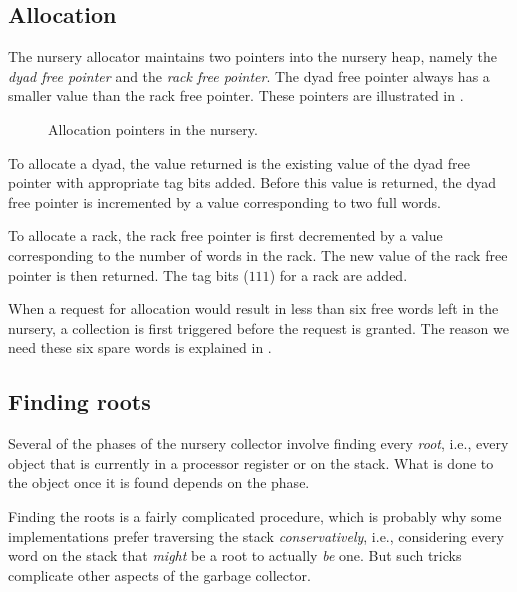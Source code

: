 \subsection{Allocation}

The nursery allocator maintains two pointers into the nursery heap,
namely the \emph{dyad free pointer} and the \emph{rack free
  pointer}.  The dyad free pointer always has a smaller value than
the rack free pointer.  These pointers are illustrated in
.

\begin{figure}
\begin{center}
\end{center}
\caption{\label{fig-nursery-pointers}
Allocation pointers in the nursery.}
\end{figure}

To allocate a dyad, the value returned is the existing value of the
dyad free pointer with appropriate tag bits added.  Before this value
is returned, the dyad free pointer is incremented by a value
corresponding to two full words.

To allocate a rack, the rack free pointer is first decremented by a
value corresponding to the number of words in the rack.  The new value
of the rack free pointer is then returned.  The tag bits ($111$) for a
rack are added.

When a request for allocation would result in less than six free words
left in the nursery, a collection is first triggered before the
request is granted.  The reason we need these six spare words is
explained in .

\subsection{Finding roots}
\label{sec-garbage-collection-finding-roots}

Several of the phases of the nursery collector involve finding every
\emph{root}, i.e., every \commonlisp{} object that is currently in a
processor register or on the stack.  What is done to the object once
it is found depends on the phase.

Finding the roots is a fairly complicated procedure, which is probably
why some implementations prefer traversing the stack
\emph{conservatively}, i.e., considering every word on the stack that
\emph{might} be a root to actually \emph{be} one.  But such tricks
complicate other aspects of the garbage collector.

